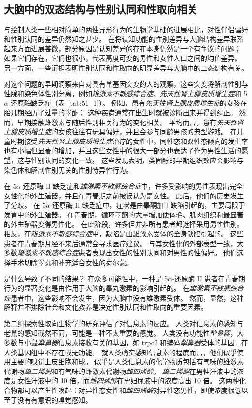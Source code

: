 \subsection{大脑中的双态结构与性别认同和性取向相关}

与绘制人类一些相对简单的两性异形行为的生物学基础的进展相比，对性伴侣偏好和性别认同的差异仍然知之甚少。
在将认知功能的性别差异与大脑结构差异联系起来方面进展甚微，部分原因是认知差异的存在本身仍然是一个有争议的问题；
如果它们存在，它们也很小，代表高度可变的男性和女性人口之间的均值差异。
另一方面，一些证据表明性别认同和性取向的明显差异与大脑中的二态结构有关。


对这个问题的早期洞察来自对具有单基因突变的人的观察，这些突变将解剖性别与性腺和染色体性别分离，例如\textit{雄激素不敏感综合症}、\textit{先天性肾上腺皮质增生症}和 5$\alpha$-还原酶缺乏症（表~\ref{tab:51_1}）。
例如，患有\textit{先天性肾上腺皮质增生症}的女孩在胎儿期经历了过量的睾酮；
这种疾病通常在出生时就被诊断出来并得到纠正。
然而，早期接触雄激素与随后性别相关行为的变化相关。
平均而言，患有\textit{先天性肾上腺皮质增生症}的女孩往往有玩具偏好，并且会参与同龄男孩的典型游戏。
在儿童时期接受\textit{先天性肾上腺皮质增生症}治疗的女性中，同性恋和双性恋倾向的发生率也有小幅但显著的增加，并且这些女性中的很大一部分也表达了作为男性生活的愿望，这与性别认同的变化一致。
这些发现表明，类固醇的早期组织效应会影响与染色体和解剖性别无关的性别特异性行为。


在 5$\alpha$-还原酶 II 缺乏症和\textit{雄激素不敏感综合症}中，许多受影响的男性表现出完全女性化的外生殖器，并且在青春期之前被误认为是女性。
此后，他们的历史发生了分歧。
在 5$\alpha$-还原酶 II 缺乏症中，症状是由睾酮加工缺陷引起的，主要局限于发育中的外生殖器。
在青春期，循环睾酮的大量增加使体毛、肌肉组织和最显著的外生殖器变得男性化。
在此阶段，许多但并非所有患者都选择采用男性性别。
相反，在\textit{雄激素不敏感综合症}中，缺陷是由雄激素受体的全身缺陷引起的。
这些患者在青春期月经不来后通常会寻求医疗建议。
与其女性化的外部表型一致，大多数\textit{雄激素不敏感综合症}患者表现出女性的性别认同和对男性的性偏好。
他们选择手术切除睾丸和补充适合女性的荷尔蒙。


是什么导致了不同的结果？
在众多可能性中，一种是 5$\alpha$-还原酶 II 患者在青春期行为的显著变化是由作用于大脑的睾丸激素的影响引起的。
在\textit{雄激素不敏感综合症}患者中，这些影响不会发生，因为大脑中没有雄激素受体。
然而，显然，这种解释并不排除社会和文化教养是决定性别认同和性取向的重要因素。


第二组探索性取向生物学的研究评估了对信息素的反应。
人类对信息素的感知与老鼠的感知截然不同，可能是一种不太重要的感觉。
人类没有功能性\textit{犁鼻器}，大多数与小鼠\textit{犁鼻器}信息素接收有关的基因，如 trpc2 和编码\textit{犁鼻器}受体的基因，在人类基因组中不存在或无功能。
就人类确实感知信息素的程度而言，他们似乎使用主要的嗅觉上皮细胞和球。
似乎是人类信息素的化学物质包括有气味的雄激素代谢物\textit{雄二烯酮}和有气味的雌激素代谢物\textit{雌四烯醇}。
\textit{雄二烯酮}在男性汗液中的浓度是女性汗液中的 10 倍，而\textit{雌四烯醇}在孕妇尿液中的浓度高出 10 倍。
这两种化合物都可以产生性唤起：对异性恋女性和\textit{雌四烯醇}对异性恋男性，即使浓度很低以至于没有有意识的嗅觉感知。


